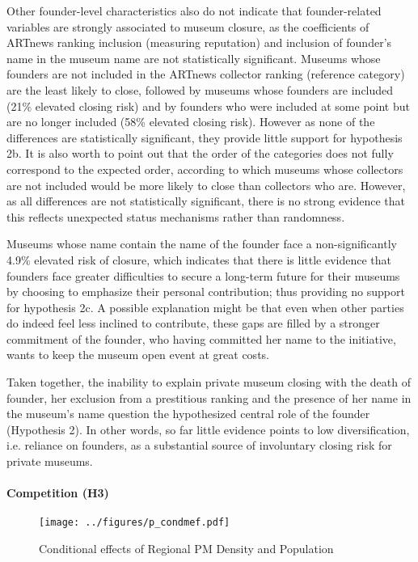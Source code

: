 \documentclass[12pt]{article}
\begin{document}
Other founder-level characteristics also do not indicate that founder-related variables are strongly associated to museum closure, as the coefficients of ARTnews ranking inclusion (measuring reputation) and inclusion of founder's name in the museum name are not statistically significant.
Museums whose founders are not included in the ARTnews collector ranking (reference category) are the least likely to close, followed by museums whose founders are included (21\% elevated closing risk) and by founders who were included at some point but are no longer included (58\% elevated closing risk).
However as none of the differences are statistically significant, they provide little support for hypothesis 2b.
It is also worth to point out that the order of the categories does not fully correspond to the expected order, according to which museums whose collectors are not included would be more likely to close than collectors who are.
However, as all differences are not statistically significant, there is no strong evidence that this reflects unexpected status mechanisms rather than randomness.




Museums whose name contain the name of the founder face a non-significantly 4.9\% elevated risk of closure, which indicates that there is little evidence that founders face greater difficulties to secure a long-term future for their museums by choosing to emphasize their personal contribution; thus providing no support for hypothesis 2c.
A possible explanation might be that even when other parties do indeed feel less inclined to contribute, these gaps are filled by a stronger commitment of the founder, who having committed her name to the initiative, wants to keep the museum open event at great costs.





Taken together, the inability to explain private museum closing with the death of founder, her exclusion from a prestitious ranking and the presence of her name in the museum's name question the hypothesized central role of the founder (Hypothesis 2).
In other words, so far little evidence points to low diversification, i.e. reliance on founders, as a substantial source of involuntary closing risk for private museums.
\paragraph*{Competition (H3)}


\begin{figure}[htbp]
\centering
\texttt{[image: ../figures/p\_condmef.pdf]}
\caption{\label{fig:p_condmef}Conditional effects of Regional PM Density and Population}
\end{figure}
\end{document}
